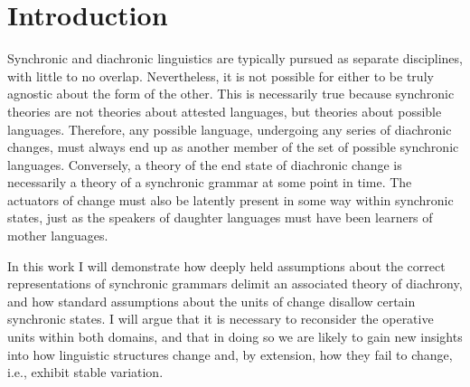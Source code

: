 \chapter{Introduction}

Synchronic and diachronic linguistics are typically pursued as separate
disciplines, with little to no overlap. Nevertheless, it is not possible
for either to be truly agnostic about the form of the other. This
is necessarily true because synchronic theories are not theories about
attested languages, but theories about possible languages. Therefore,
any possible language, undergoing any series of diachronic changes,
must always end up as another member of the set of possible synchronic
languages. Conversely, a theory of the end state of diachronic change
is necessarily a theory of a synchronic grammar at some point in time.
The actuators of change must also be latently present in some way
within synchronic states, just as the speakers of daughter languages
must have been learners of mother languages.

In this work I will demonstrate how deeply held assumptions about
the correct representations of synchronic grammars delimit an associated
theory of diachrony, and how standard assumptions about the units
of change disallow certain synchronic states. I will argue that it
is necessary to reconsider the operative units within both domains,
and that in doing so we are likely to gain new insights into how linguistic
structures change and, by extension, how they fail to change, i.e.,
exhibit stable variation.

